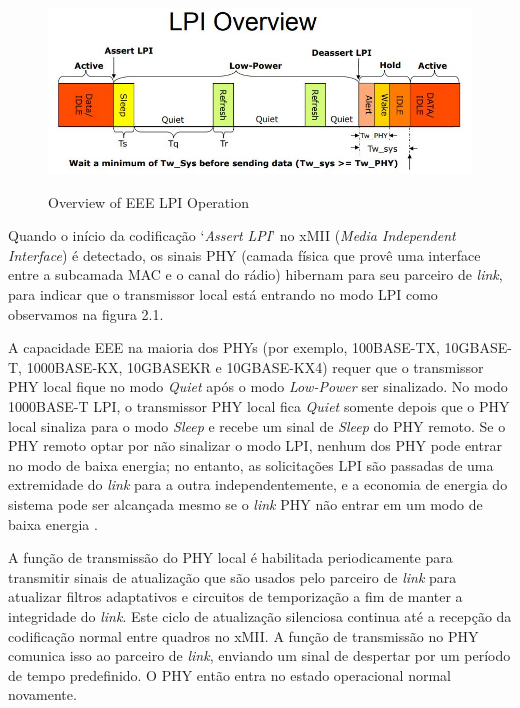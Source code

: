 \begin{figure}[htp]
    \centering
    \includegraphics[width=16cm]{2-fundam/Figura_1.jpg}
    \caption{Overview of EEE LPI Operation}
    \cite{EEEOverview}
    \label{fig:eeelpi}
\end{figure}

Quando o início da codificação `\emph{Assert LPI}' no xMII (\emph{Media Independent Interface}) é detectado, os sinais PHY (camada física que provê uma interface entre a subcamada MAC e o canal do rádio) hibernam para seu parceiro de \emph{link}, para indicar que o transmissor local está entrando no modo LPI como observamos na figura 2.1.

A capacidade EEE na maioria dos PHYs (por exemplo, 100BASE-TX, 10GBASE-T, 1000BASE-KX, 10GBASEKR e 10GBASE-KX4) requer que o transmissor PHY local fique no modo \emph{Quiet} após o modo \emph{Low-Power} ser sinalizado.  No modo 1000BASE-T LPI, o transmissor PHY local fica \emph{Quiet} somente depois que o PHY local sinaliza para o modo \emph{Sleep} e recebe um sinal de \emph{Sleep} do PHY remoto. Se o PHY remoto optar por não sinalizar o modo LPI, nenhum dos PHY pode entrar no modo de baixa energia; no entanto, as solicitações LPI são passadas de uma extremidade do \emph{link} para a outra independentemente, e a economia de energia do sistema pode ser alcançada mesmo se o \emph{link} PHY não entrar em um modo de baixa energia \cite{5621025}.

A função de transmissão do PHY local é habilitada periodicamente para transmitir sinais de atualização que são usados pelo parceiro de \emph{link} para atualizar filtros adaptativos e circuitos de temporização a fim de manter a integridade do \emph{link}. Este ciclo de atualização silenciosa continua até a recepção da codificação normal entre quadros no xMII. A função de transmissão no PHY comunica isso ao parceiro de \emph{link}, enviando um sinal de despertar por um período de tempo predefinido. O PHY então entra no estado operacional normal novamente.


